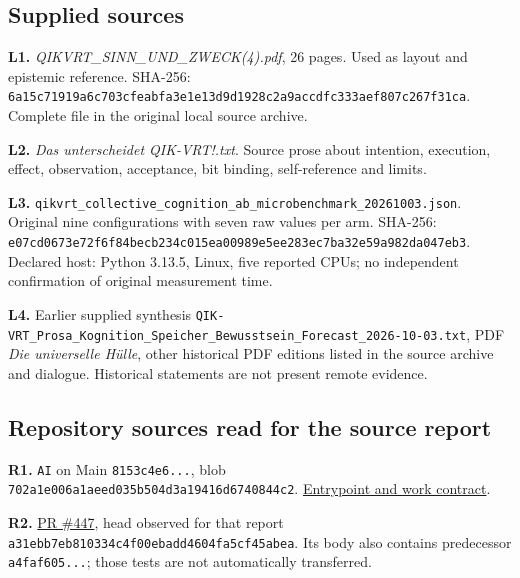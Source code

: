 \begin{cols}
\subsection*{Supplied sources}
\textbf{L1.} \emph{QIKVRT\_SINN\_UND\_ZWECK(4).pdf}, 26 pages. Used as layout and epistemic reference. SHA-256: \nolinkurl{6a15c71919a6c703cfeabfa3e1e13d9d1928c2a9accdfc333aef807c267f31ca}. Complete file in the original local source archive.

\textbf{L2.} \emph{Das unterscheidet QIK-VRT!.txt}. Source prose about intention, execution, effect, observation, acceptance, bit binding, self-reference and limits.

\textbf{L3.} \nolinkurl{qikvrt_collective_cognition_ab_microbenchmark_20261003.json}. Original nine configurations with seven raw values per arm. SHA-256: \nolinkurl{e07cd0673e72f6f84becb234c015ea00989e5ee283ec7ba32e59a982da047eb3}. Declared host: Python 3.13.5, Linux, five reported CPUs; no independent confirmation of original measurement time.

\textbf{L4.} Earlier supplied synthesis \nolinkurl{QIK-VRT_Prosa_Kognition_Speicher_Bewusstsein_Forecast_2026-10-03.txt}, PDF \emph{Die universelle Hülle}, other historical PDF editions listed in the source archive and dialogue. Historical statements are not present remote evidence.

\subsection*{Repository sources read for the source report}
\textbf{R1.} \texttt{AI} on Main \texttt{8153c4e6...}, blob \nolinkurl{702a1e006a1aeed035b504d3a19416d6740844c2}. \href{https://github.com/ingolf-lohmann/qik-vrt/blob/8153c4e69a6245aadf67f0741fb50d9707c19e34/AI}{Entrypoint and work contract}.

\textbf{R2.} \href{https://github.com/ingolf-lohmann/qik-vrt/pull/447}{PR \#447}, head observed for that report \nolinkurl{a31ebb7eb810334c4f00ebadd4604fa5cf45abea}. Its body also contains predecessor \texttt{a4faf605...}; those tests are not automatically transferred.


\end{cols}
